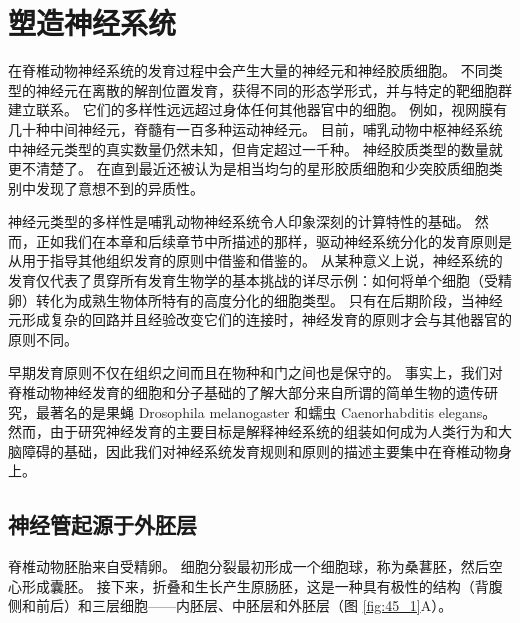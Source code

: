 \chapter{塑造神经系统} \label{chap:chap45}
在脊椎动物神经系统的发育过程中会产生大量的神经元和神经胶质细胞。 不同类型的神经元在离散的解剖位置发育，获得不同的形态学形式，并与特定的靶细胞群建立联系。 它们的多样性远远超过身体任何其他器官中的细胞。 例如，视网膜有几十种中间神经元，脊髓有一百多种运动神经元。 目前，哺乳动物中枢神经系统中神经元类型的真实数量仍然未知，但肯定超过一千种。 神经胶质类型的数量就更不清楚了。 在直到最近还被认为是相当均匀的星形胶质细胞和少突胶质细胞类别中发现了意想不到的异质性。

神经元类型的多样性是哺乳动物神经系统令人印象深刻的计算特性的基础。 然而，正如我们在本章和后续章节中所描述的那样，驱动神经系统分化的发育原则是从用于指导其他组织发育的原则中借鉴和借鉴的。 从某种意义上说，神经系统的发育仅代表了贯穿所有发育生物学的基本挑战的详尽示例：如何将单个细胞（受精卵）转化为成熟生物体所特有的高度分化的细胞类型。 只有在后期阶段，当神经元形成复杂的回路并且经验改变它们的连接时，神经发育的原则才会与其他器官的原则不同。

早期发育原则不仅在组织之间而且在物种和门之间也是保守的。 事实上，我们对脊椎动物神经发育的细胞和分子基础的了解大部分来自所谓的简单生物的遗传研究，最著名的是果蝇 Drosophila melanogaster 和蠕虫 Caenorhabditis elegans。 然而，由于研究神经发育的主要目标是解释神经系统的组装如何成为人类行为和大脑障碍的基础，因此我们对神经系统发育规则和原则的描述主要集中在脊椎动物身上。

\section{神经管起源于外胚层}

脊椎动物胚胎来自受精卵。 细胞分裂最初形成一个细胞球，称为桑葚胚，然后空心形成囊胚。 接下来，折叠和生长产生原肠胚，这是一种具有极性的结构（背腹侧和前后）和三层细胞——内胚层、中胚层和外胚层（图 \ref{fig:45_1}A）。

